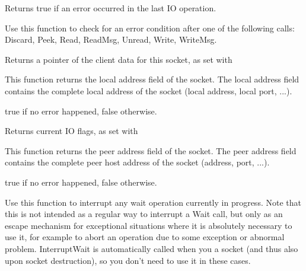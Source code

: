 Returns true if an error occurred in the last IO operation.

Use this function to check for an error condition after one of the
following calls: Discard, Peek, Read, ReadMsg, Unread, Write, WriteMsg.

%
%
\label{wxsocketbasegetclientdata}


Returns a pointer of the client data for this socket, as set with 

%
%
\label{wxsocketbasegetlocal}


This function returns the local address field of the socket. The local
address field contains the complete local address of the socket (local
address, local port, ...).


true if no error happened, false otherwise.

%
%
\label{wxsocketbasegetflags}


Returns current IO flags, as set with 

%
%
\label{wxsocketbasegetpeer}


This function returns the peer address field of the socket. The peer 
address field contains the complete peer host address of the socket
(address, port, ...).


true if no error happened, false otherwise.

%
%
\label{wxsocketbaseinterruptwait}


Use this function to interrupt any wait operation currently in progress.
Note that this is not intended as a regular way to interrupt a Wait call,
but only as an escape mechanism for exceptional situations where it is
absolutely necessary to use it, for example to abort an operation due to
some exception or abnormal problem. InterruptWait is automatically called
when you  a socket (and thus also upon
socket destruction), so you don't need to use it in these cases.

